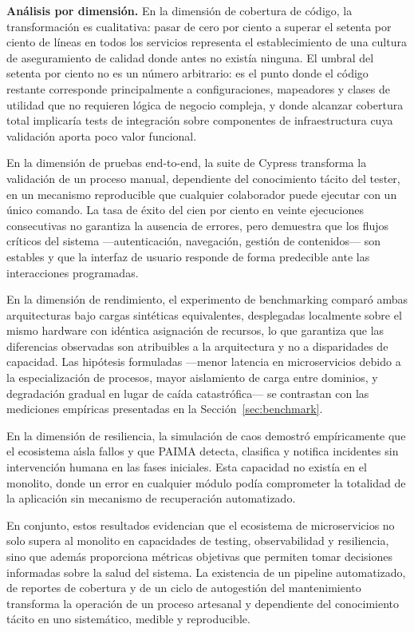 \textbf{Análisis por dimensión.} En la dimensi\'{o}n de cobertura de c\'{o}digo,
la transformaci\'{o}n es cualitativa: pasar de cero por ciento a superar el setenta
por ciento de l\'{i}neas en todos los servicios representa el establecimiento de una
cultura de aseguramiento de calidad donde antes no exist\'{i}a ninguna. El umbral del setenta
por ciento no es un n\'{u}mero arbitrario: es el punto donde el c\'{o}digo restante
corresponde principalmente a configuraciones, mapeadores y clases de utilidad que
no requieren l\'{o}gica de negocio compleja, y donde alcanzar cobertura total
implicar\'{i}a tests de integraci\'{o}n sobre componentes de infraestructura cuya
validaci\'{o}n aporta poco valor funcional.

En la dimensi\'{o}n de pruebas end-to-end, la suite de Cypress transforma la
validaci\'{o}n de un proceso manual, dependiente del conocimiento t\'{a}cito del
tester, en un mecanismo reproducible que cualquier colaborador puede ejecutar con
un \'{u}nico comando. La tasa de \'{e}xito del cien por ciento en veinte ejecuciones
consecutivas no garantiza la ausencia de errores, pero demuestra que los flujos
cr\'{i}ticos del sistema ---autenticaci\'{o}n, navegaci\'{o}n, gesti\'{o}n de
contenidos--- son estables y que la interfaz de usuario responde de forma
predecible ante las interacciones programadas.

En la dimensi\'{o}n de rendimiento, el experimento de benchmarking compar\'{o}
ambas arquitecturas bajo cargas sint\'{e}ticas equivalentes, desplegadas localmente
sobre el mismo hardware con id\'{e}ntica asignaci\'{o}n de recursos, lo que garantiza
que las diferencias observadas son atribuibles a la arquitectura y no a
disparidades de capacidad. Las hip\'{o}tesis formuladas ---menor latencia en
microservicios debido a la especializaci\'{o}n de procesos, mayor aislamiento de
carga entre dominios, y degradaci\'{o}n gradual en lugar de ca\'{i}da
catastr\'{o}fica--- se contrastan con las mediciones emp\'{i}ricas presentadas en la
Secci\'{o}n~\ref{sec:benchmark}.

En la dimensi\'{o}n de resiliencia, la simulaci\'{o}n de caos demostr\'{o}
emp\'{i}ricamente que el ecosistema a\'{\i}sla fallos y que PAIMA detecta,
clasifica y notifica incidentes sin intervenci\'{o}n humana en las fases iniciales.
Esta capacidad no exist\'{i}a en el monolito, donde un error en cualquier m\'{o}dulo
pod\'{i}a comprometer la totalidad de la aplicaci\'{o}n sin mecanismo de
recuperaci\'{o}n automatizado.

En conjunto, estos resultados evidencian que el ecosistema de microservicios no
solo supera al monolito en capacidades de testing, observabilidad y resiliencia,
sino que adem\'{a}s proporciona m\'{e}tricas objetivas que permiten tomar decisiones
informadas sobre la salud del sistema. La existencia de un pipeline automatizado, de reportes de
cobertura y de un ciclo de autogestión del mantenimiento transforma la operación
de un proceso artesanal y dependiente del conocimiento tácito en uno sistemático,
medible y reproducible.

